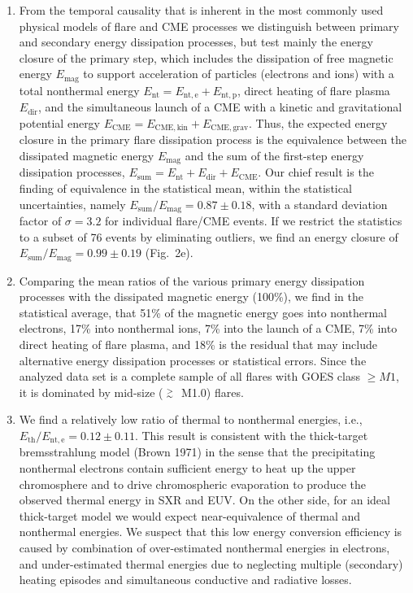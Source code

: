 \documentclass[10pt,preprint]{aastex}  %
\def\gapprox{\lower.4ex\hbox{$\;\buildrel >\over{\scriptstyle\sim}\;$}}
\begin{document}
\begin{enumerate}

\item{ From the temporal
causality that is inherent in the most commonly used physical models of 
flare and CME processes we distinguish between primary and secondary energy
dissipation processes, but test mainly the energy closure of the
primary step, which includes the dissipation of free magnetic energy
$E_{\mathrm{mag}}$ to support acceleration of particles (electrons and ions)
with a total nonthermal energy $E_{\mathrm{nt}}=E_{\mathrm{nt,e}}+E_{\mathrm{nt,p}}$,
direct heating of flare plasma $E_{\mathrm{dir}}$, 
and the simultaneous launch of a CME with a kinetic and
gravitational potential energy 
$E_{\mathrm{CME}} = E_{\mathrm{CME,kin}} + E_{\mathrm{CME,grav}}$.
Thus, the expected energy closure in the primary flare dissipation process is
the equivalence between the dissipated magnetic energy $E_{\mathrm{mag}}$ and
the sum of the first-step energy dissipation processes, 
$E_{\mathrm{sum}} = E_{\mathrm{nt}} + E_{\mathrm{dir}} + E_{\mathrm{CME}}$. 
Our chief result is the finding of
equivalence in the statistical mean, within the statistical uncertainties, 
namely $E_{\mathrm{sum}}/E_{\mathrm{mag}}= 0.87 \pm 0.18$, with a standard deviation
factor of $\sigma=3.2$ for individual flare/CME events. 
If we restrict the statistics to a subset of 76 events by eliminating outliers, 
we find an energy closure of $E_{\mathrm{sum}}/E_{\mathrm{mag}}= 
0.99\pm0.19$ (Fig.~2e).}

\item{
Comparing the mean ratios of the various primary energy dissipation
processes with the dissipated magnetic energy (100\%), we find in
the statistical average, that 
51\% of the magnetic energy goes into nonthermal electrons,
17\% into nonthermal ions,
7\% into the launch of a CME,
7\% into direct heating of flare plasma,
and 18\% is the residual that may include alternative energy dissipation
processes or statistical errors. Since the analyzed data set is a complete 
sample of all flares with GOES class $\ge M1$, it is dominated by mid-size
($\gapprox$ M1.0) flares.}

\item{
We find a relatively low ratio of thermal to nonthermal energies, i.e.,
$E_{\mathrm{th}}/E_{\mathrm{nt,e}}=0.12 \pm 0.11$. 
This result is consistent with the 
thick-target bremsstrahlung model (Brown 1971) in the sense that
the precipitating nonthermal electrons contain sufficient energy
to heat up the upper chromosphere and to drive chromospheric evaporation
to produce the observed thermal energy in SXR and EUV.
On the other side, for an ideal thick-target model we would expect
near-equivalence of thermal and nonthermal energies. We suspect that
this low energy conversion efficiency is caused by combination of
over-estimated nonthermal energies in electrons, and
under-estimated thermal energies due to neglecting multiple (secondary) 
heating episodes and simultaneous conductive and radiative losses.}


\end{enumerate}
\end{document}
